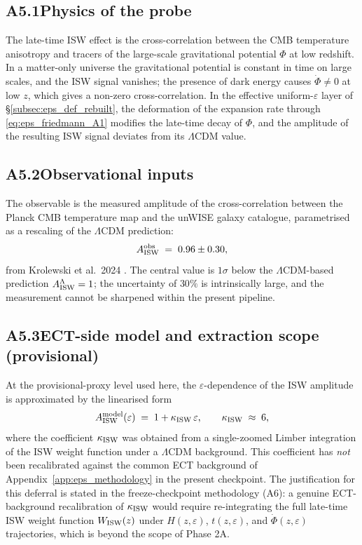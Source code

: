 \subsection*{A5.1\quad Physics of the probe}

The late-time ISW effect is the cross-correlation between the
CMB temperature anisotropy and tracers of the large-scale
gravitational potential $\Phi$ at low redshift. In a matter-only
universe the gravitational potential is constant in time on large
scales, and the ISW signal vanishes; the presence of dark
energy causes $\dot\Phi \neq 0$ at low $z$, which gives a
non-zero cross-correlation. In the effective uniform-$\varepsilon$
layer of \S\ref{subsec:eps_def_rebuilt}, the deformation of the
expansion rate through \eqref{eq:eps_friedmann_A1} modifies the
late-time decay of $\Phi$, and the amplitude of the resulting
ISW signal deviates from its $\Lambda$CDM value.

\subsection*{A5.2\quad Observational inputs}

The observable is the measured amplitude of the cross-correlation
between the Planck CMB temperature map and the unWISE galaxy
catalogue, parametrised as a rescaling of the $\Lambda$CDM
prediction:
\begin{equation}
A_{\rm ISW}^{\rm obs} \;=\; 0.96 \pm 0.30,
\end{equation}
from Krolewski et al.\ 2024 \cite{Krolewski2024}. The central
value is $1\sigma$ below the $\Lambda$CDM-based prediction
$A_{\rm ISW}^{\Lambda} = 1$; the uncertainty of $30\%$ is
intrinsically large, and the measurement cannot be sharpened
within the present pipeline.

\subsection*{A5.3\quad ECT-side model and extraction scope
(provisional)}

At the provisional-proxy level used here, the
$\varepsilon$-dependence of the ISW amplitude is approximated by
the linearised form
\begin{equation}
A_{\rm ISW}^{\rm model}(\varepsilon)
\;=\;
1 + \kappa_{\rm ISW}\,\varepsilon,
\qquad
\kappa_{\rm ISW} \;\approx\; 6,
\label{eq:A_ISW_model}
\end{equation}
where the coefficient $\kappa_{\rm ISW}$ was obtained from a
single-zoomed Limber integration of the ISW weight function under
a $\Lambda$CDM background. This coefficient has \emph{not} been
recalibrated against the common ECT background of
Appendix~\ref{app:eps_methodology} in the present checkpoint.
The justification for this deferral is stated in the
freeze-checkpoint methodology (A6): a genuine ECT-background
recalibration of $\kappa_{\rm ISW}$ would require re-integrating
the full late-time ISW weight function $W_{\rm ISW}(z)$ under
$H(z, \varepsilon)$, $t(z, \varepsilon)$, and $\dot\Phi(z, \varepsilon)$
trajectories, which is beyond the scope of Phase 2A.

